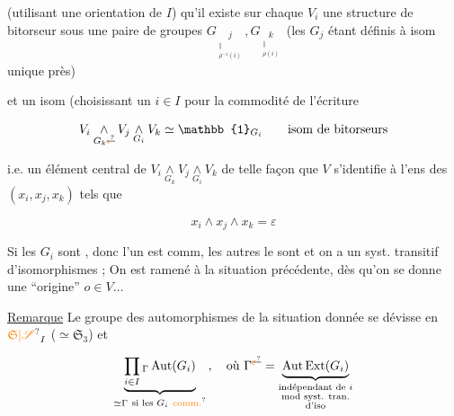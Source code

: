 
(utilisant une orientation de $I$) qu'il existe sur chaque $V_i$ une structure de bitorseur  sous une paire de groupes $G_{\underset{\substack{\Vert\\\rho^{-1}(i)}}{j}},G_{\underset{\substack{\Vert\\\rho(i)}}{k}}$ (les $G_j$ étant définis  à isom unique près)


et un isom (choisissant un $i\in I$ pour la commodité de l'écriture

\[
V_i\mathbin{\underset{G_k\deleted{\unsure{i}}}{\wedge}}V_j
 \mathbin{\underset{G_i}{\wedge}}V_k\simeq\mathbb{1}_{G_i}
 \qquad\text{isom de bitorseurs}
\]

i.e. un élément central  de $V_i\mathbin{\underset{G_k}{\wedge}}V_j\mathbin{\underset{G_i}{\wedge}}V_k$ de telle façon que $V$ s'identifie à l'ens des $(x_i,x_j,x_k)$ tels que

\[
 x_i\wedge x_j\wedge x_k=\varepsilon
\]

Si les $G_i$ sont  , donc  l'un est comm, les autres le sont et on a un syst. transitif d'isomorphismes ; On est ramené à la situation précédente, dès qu'on se donne une ``origine'' $o\in V\ldots$


 \uline{Remarque} Le groupe des automorphismes de la situation donnée se dévisse en $\unsure{\mathfrak S|\mathscr S}_I$ ($\simeq\mathfrak S_3$)  et

\[
\underset{\simeq\Gamma\ \text{si les }G_i\ \text{\unsure{comm.}}}{\underbrace{\prod_{i\in I}{}_{\Gamma}\operatorname{Aut}(G_{i})}}\,,
\quad\text{où }\Gamma^{\deleted{\unsure{\varepsilon}}}=
 \underbrace{\operatorname{Aut}\operatorname{Ext}(G_i)}_{\substack{\text{indépendant de }i\\\text{mod syst. tran.}\\\text{d'iso}}}
\]

